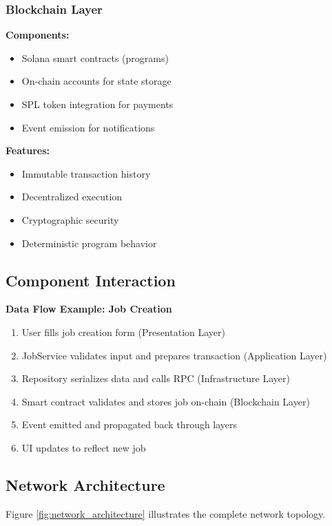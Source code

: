 \documentclass[a4paper,13pt,twoside]{report}
\theoremstyle{definition}
\begin{document}
\subsubsection{Blockchain Layer}

\textbf{Components:}
\begin{itemize}
    \item Solana smart contracts (programs)
    \item On-chain accounts for state storage
    \item SPL token integration for payments
    \item Event emission for notifications
\end{itemize}

\textbf{Features:}
\begin{itemize}
    \item Immutable transaction history
    \item Decentralized execution
    \item Cryptographic security
    \item Deterministic program behavior
\end{itemize}

\subsection{Component Interaction}

\textbf{Data Flow Example: Job Creation}
\begin{enumerate}
    \item User fills job creation form (Presentation Layer)
    \item JobService validates input and prepares transaction (Application Layer)
    \item Repository serializes data and calls RPC (Infrastructure Layer)
    \item Smart contract validates and stores job on-chain (Blockchain Layer)
    \item Event emitted and propagated back through layers
    \item UI updates to reflect new job
\end{enumerate}

\subsection{Network Architecture}

Figure \ref{fig:network_architecture} illustrates the complete network topology.
\end{document}
